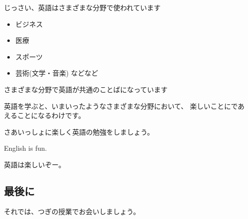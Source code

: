 \documentclass[12pt]{jlreq}
\begin{document}
\hrulefill

じっさい、英語はさまざまな分野で使われています

\begin{itemize}
 \item ビジネス
 \item 医療
 \item スポーツ
 \item 芸術(文学・音楽) などなど
\end{itemize}
さまざまな分野で英語が共通のことばになっています


\hrulefill

英語を学ぶと、いまいったようなさまざまな分野において、
楽しいことにであえることになるわけです。

さあいっしょに楽しく英語の勉強をしましょう。

\hrulefill

English is fun.

英語は楽しいぞー。



\subsection*{最後に}

それでは、つぎの授業でお会いしましょう。


\hrulefill
\hrulefill
\hrulefill
\hrulefill
\end{document}
